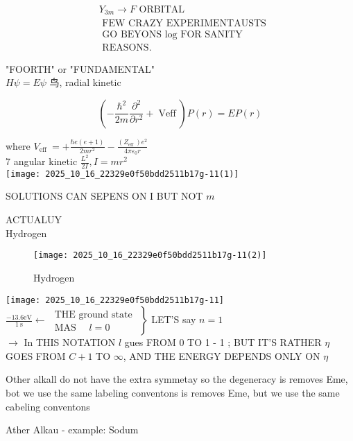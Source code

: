 $$
\begin{aligned}
& Y_{3 m} \rightarrow F \text { ORBITAL } \\
& \text { FEW CRAZY EXPERIMENTAUSTS } \\
& \text { GO BEYONS } \log \text { FOR SANITY } \\
& \text { REASONS. }
\end{aligned}
$$

"FOORTH" or "FUNDAMENTAL"\\
$H \psi=E \psi$ 鸟, radial kinetic

$$
\left(-\frac{\hbar^{2}}{2 m} \frac{\partial^{2}}{\partial r^{2}}+\operatorname{Veff}\right) P(r)=E P(r)
$$

where $V_{\text {eff }}=+\frac{\hbar e(e+1)}{2 m r^{2}}-\frac{\left(Z_{\text {eff }}\right) e^{2}}{4 \pi \varepsilon_{0} r}$\\
7 angular kinetic $\frac{L^{2}}{2 I}, I=m r^{2}$\\
\texttt{[image: 2025\_10\_16\_22329e0f50bdd2511b17g-11(1)]}

SOLUTIONS CAN SEPENS ON I BUT NOT $m$

ACTUALUY\\
Hydrogen

\begin{figure}[h]
\begin{center}
\captionsetup{labelformat=empty}
\caption{Hydrogen}
  \texttt{[image: 2025\_10\_16\_22329e0f50bdd2511b17g-11(2)]}
\end{center}
\end{figure}

\texttt{[image: 2025\_10\_16\_22329e0f50bdd2511b17g-11]}\\
$\left.\frac{-13.6 \mathrm{eV}}{1 \mathrm{~s}} \leftarrow \begin{array}{l}\text { THE ground state } \\ \text { MAS } \quad l=0\end{array}\right\}$ LET'S say $n=1$\\
$\rightarrow$ In THIS NOTATION $l$ gues FROM 0 TO 1 - 1 ; BUT IT'S RATHER $\eta$ GOES FROM $C+1$ TO $\infty$, AND THE ENERGY DEPENDS ONLY ON $\eta$

Other alkall do not have the extra symmetay so the degeneracy is removes Eme, bot we use the same labeling conventons is removes Eme, but we use the same cabeling conventons

Ather Alkau - example: Sodum

